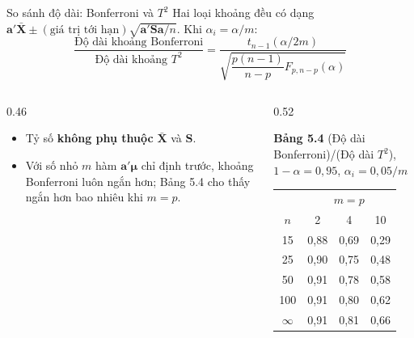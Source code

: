 \begin{frame}{So sánh độ dài: Bonferroni và $T^2$}
  \small
  \setlength{\abovedisplayskip}{2pt}
  \setlength{\belowdisplayskip}{2pt}
  Hai loại khoảng đều có dạng $\mathbf{a}'\bar{\mathbf{X}} \pm (\text{giá trị tới hạn})\sqrt{\mathbf{a}'\mathbf{S}\mathbf{a}/n}$. Khi $\alpha_i=\alpha/m$:
  \begin{equation*}
    \frac{\text{Độ dài khoảng Bonferroni}}{\text{Độ dài khoảng } T^2}
    = \frac{t_{n-1}(\alpha/2m)}{\sqrt{\dfrac{p(n-1)}{n-p}F_{p,n-p}(\alpha)}} \tag{5-30}
  \end{equation*}
  \vspace{-0.2cm}
  \begin{columns}[T]
    \begin{column}{0.46\textwidth}
      \footnotesize
      \begin{itemize}
        \item Tỷ số \textbf{không phụ thuộc} $\bar{\mathbf{X}}$ và $\mathbf{S}$.
        \item Với số nhỏ $m$ hàm $\mathbf{a}'\boldsymbol{\mu}$ chỉ định trước, khoảng Bonferroni luôn ngắn hơn; Bảng 5.4 cho thấy ngắn hơn bao nhiêu khi $m=p$.
      \end{itemize}
    \end{column}
    \begin{column}{0.52\textwidth}
      \centering
      {\scriptsize \textbf{Bảng 5.4} (Độ dài Bonferroni)/(Độ dài $T^2$), $1-\alpha=0{,}95$, $\alpha_i=0{,}05/m$\par}
      \vspace{2pt}
      \scriptsize
      \begin{tabular}{c|ccc}
        \toprule
        & \multicolumn{3}{c}{$m=p$} \\
        $n$ & 2 & 4 & 10 \\
        \midrule
        15       & 0,88 & 0,69 & 0,29 \\
        25       & 0,90 & 0,75 & 0,48 \\
        50       & 0,91 & 0,78 & 0,58 \\
        100      & 0,91 & 0,80 & 0,62 \\
        $\infty$ & 0,91 & 0,81 & 0,66 \\
        \bottomrule
      \end{tabular}
    \end{column}
  \end{columns}
\end{frame}
 
